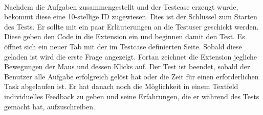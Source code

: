 \\
Nachdem die Aufgaben zusammengestellt und der Testcase erzeugt wurde, bekommt diese eine 10-stellige ID zugewiesen. Dies ist der Schlüssel zum Starten des Tests. Er sollte mit ein paar Erläuterungen an die Testuser geschickt werden. Diese geben den Code in die Extension ein und beginnen damit den Test. Es öffnet sich ein neuer Tab mit der im Testcase definierten Seite. Sobald diese geladen ist wird die erste Frage angezeigt. Fortan zeichnet die Extension jegliche Bewegungen der Maus und dessen Klicks auf. Der Test ist beendet, sobald der Benutzer alle Aufgabe erfolgreich gelöst hat oder die Zeit für einen erforderlichen Task abgelaufen ist. Er hat danach noch die Möglichkeit in einem Textfeld individuelles Feedback zu geben und seine Erfahrungen, die er während des Tests gemacht hat, aufzuschreiben.